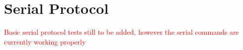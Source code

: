 \section{Serial Protocol}

\textcolor{red}{Basic serial protocol tests still to be added, however the serial commands are currently working properly}